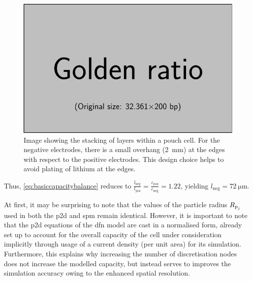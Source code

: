 \begin{figure}[!htbp]
    \centering
    \includegraphics{placeholder_images/example-image-golden.pdf}
    \caption[Stacking of layers within a pouch cell]
    {Image showing the stacking of layers within a pouch cell. For the negative
        electrodes, there is a small overhang (\approx\SI{2}{mm}) at the
        edges with respect to the positive electrodes. This design choice
    helps to avoid plating of lithium at the edges.}
    \label{fig:anodeoverhangpouchcell}
\end{figure}

Thus, \cref{eq:basiccapacitybalance}                                     reduces
to                      $\frac{l_\text{neg}}{l_\text{pos}}                     =
\frac{\varepsilon_\text{pos}}{\varepsilon_\text{neg}}    =    1.22$,    yielding
$l_\text{neg} = \SI{72}{\micro\meter}$.

At first, it  may be surprising to  note that the values of  the particle radius
$R_{{\text{p}_j}}$ used in  both the \gls{p2d} and \gls{spm} remain  identical. However, it
is important  to note that  the \gls{p2d} equations  of the \gls{dfn}  model are
cast in  a normalised  form, \ie{}  already set  up to  account for  the overall
capacity of the  cell under consideration implicitly through usage  of a current
density  (per unit  area) for  its  simulation. Furthermore,  this explains  why
increasing the  number of  discretisation nodes does  not increase  the modelled
capacity, but  instead serves to improves  the simulation accuracy owing  to the
enhanced spatial resolution.


